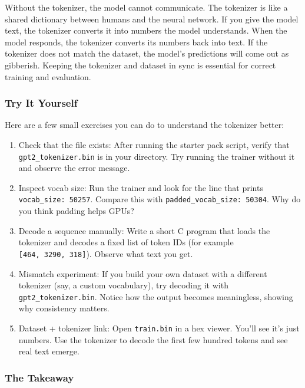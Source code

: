 \documentclass[
  letterpaper,
  DIV=11,
  numbers=noendperiod]{scrreprt}
\providecommand{\tightlist}{%
  \setlength{\itemsep}{0pt}\setlength{\parskip}{0pt}}
\begin{document}
Without the tokenizer, the model cannot communicate. The tokenizer is
like a shared dictionary between humans and the neural network. If you
give the model text, the tokenizer converts it into numbers the model
understands. When the model responds, the tokenizer converts its numbers
back into text. If the tokenizer does not match the dataset, the model's
predictions will come out as gibberish. Keeping the tokenizer and
dataset in sync is essential for correct training and evaluation.

\subsubsection{Try It Yourself}\label{try-it-yourself}

Here are a few small exercises you can do to understand the tokenizer
better:

\begin{enumerate}
\def\labelenumi{\arabic{enumi}.}
\tightlist
\item
  Check that the file exists: After running the starter pack script,
  verify that \texttt{gpt2\_tokenizer.bin} is in your directory. Try
  running the trainer without it and observe the error message.
\item
  Inspect vocab size: Run the trainer and look for the line that prints
  \texttt{vocab\_size:\ 50257}. Compare this with
  \texttt{padded\_vocab\_size:\ 50304}. Why do you think padding helps
  GPUs?
\item
  Decode a sequence manually: Write a short C program that loads the
  tokenizer and decodes a fixed list of token IDs (for example
  \texttt{{[}464,\ 3290,\ 318{]}}). Observe what text you get.
\item
  Mismatch experiment: If you build your own dataset with a different
  tokenizer (say, a custom vocabulary), try decoding it with
  \texttt{gpt2\_tokenizer.bin}. Notice how the output becomes
  meaningless, showing why consistency matters.
\item
  Dataset + tokenizer link: Open \texttt{train.bin} in a hex viewer.
  You'll see it's just numbers. Use the tokenizer to decode the first
  few hundred tokens and see real text emerge.
\end{enumerate}

\subsubsection{The Takeaway}\label{the-takeaway}
\end{document}
